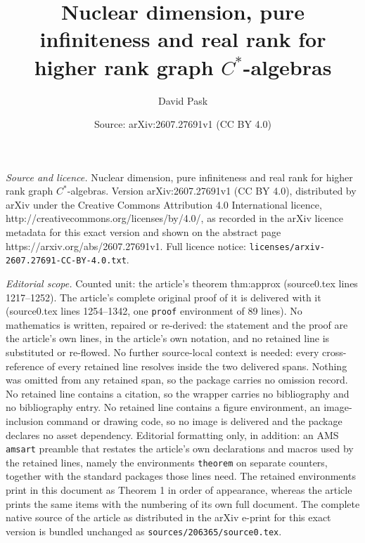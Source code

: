 \documentclass[10pt,a4paper]{amsart}
\title{Nuclear dimension, pure infiniteness and real rank for higher rank graph $C^*$-algebras}
\author{David Pask}
\date{Source: arXiv:2607.27691v1 (CC BY 4.0)}
\begin{document}
\maketitle

\noindent\emph{Source and licence.} Nuclear dimension, pure infiniteness and real rank for higher rank graph $C^*$-algebras. Version arXiv:2607.27691v1 (CC BY 4.0), distributed by arXiv under the Creative Commons Attribution 4.0 International licence, http://creativecommons.org/licenses/by/4.0/, as recorded in the arXiv licence metadata for this exact version and shown on the abstract page https://arxiv.org/abs/2607.27691v1. Full licence notice: \texttt{licenses/arxiv-2607.27691-CC-BY-4.0.txt}.\par\smallskip

\noindent\textit{Editorial scope.} Counted unit: the article's theorem thm:approx (source0.tex lines 1217--1252). The article's complete original proof of it is delivered with it (source0.tex lines 1254--1342, one \texttt{proof} environment of 89 lines). No mathematics is written, repaired or re-derived: the statement and the proof are the article's own lines, in the article's own notation, and no retained line is substituted or re-flowed.  No further source-local context is needed: every cross-reference of every retained line resolves inside the two delivered spans.  Nothing was omitted from any retained span, so the package carries no omission record.  No retained line contains a citation, so the wrapper carries no bibliography and no bibliography entry.  No retained line contains a figure environment, an image-inclusion command or drawing code, so no image is delivered and the package declares no asset dependency.  Editorial formatting only, in addition: an AMS \texttt{amsart} preamble that restates the article's own declarations and macros used by the retained lines, namely the environments \texttt{theorem} on separate counters, together with the standard packages those lines need.  The retained environments print in this document as Theorem 1 in order of appearance, whereas the article prints the same items with the numbering of its own full document.  The complete native source of the article as distributed in the arXiv e-print for this exact version is bundled unchanged as \texttt{sources/206365/source0.tex}.
\end{document}
